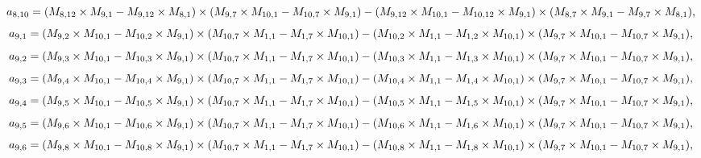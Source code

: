 \documentclass[10pt]{asme2ej}
\begin{document}
\begin{landscape}
\begin{equation}
    a_{8,10} = (M_{8,12}\times M_{9,1}-M_{9,12}\times M_{8,1})\times (M_{9,7}\times M_{10,1}-M_{10,7}\times M_{9,1})\\-(M_{9,12}\times M_{10,1}-M_{10,12}\times M_{9,1})\times (M_{8,7}\times M_{9,1}-M_{9,7}\times M_{8,1}),
\end{equation}
\begin{equation}
    a_{9,1} = (M_{9,2}\times M_{10,1}-M_{10,2}\times M_{9,1})\times (M_{10,7}\times M_{1,1}-M_{1,7}\times M_{10,1})\\-(M_{10,2}\times M_{1,1}-M_{1,2}\times M_{10,1})\times (M_{9,7}\times M_{10,1}-M_{10,7}\times M_{9,1}),
\end{equation}
\begin{equation}
    a_{9,2} = (M_{9,3}\times M_{10,1}-M_{10,3}\times M_{9,1})\times (M_{10,7}\times M_{1,1}-M_{1,7}\times M_{10,1})\\-(M_{10,3}\times M_{1,1}-M_{1,3}\times M_{10,1})\times (M_{9,7}\times M_{10,1}-M_{10,7}\times M_{9,1}),
\end{equation}
\begin{equation}
    a_{9,3} = (M_{9,4}\times M_{10,1}-M_{10,4}\times M_{9,1})\times (M_{10,7}\times M_{1,1}-M_{1,7}\times M_{10,1})\\-(M_{10,4}\times M_{1,1}-M_{1,4}\times M_{10,1})\times (M_{9,7}\times M_{10,1}-M_{10,7}\times M_{9,1}),
\end{equation}
\begin{equation}
    a_{9,4} = (M_{9,5}\times M_{10,1}-M_{10,5}\times M_{9,1})\times (M_{10,7}\times M_{1,1}-M_{1,7}\times M_{10,1})\\-(M_{10,5}\times M_{1,1}-M_{1,5}\times M_{10,1})\times (M_{9,7}\times M_{10,1}-M_{10,7}\times M_{9,1}),
\end{equation}
\begin{equation}
    a_{9,5} = (M_{9,6}\times M_{10,1}-M_{10,6}\times M_{9,1})\times (M_{10,7}\times M_{1,1}-M_{1,7}\times M_{10,1})\\-(M_{10,6}\times M_{1,1}-M_{1,6}\times M_{10,1})\times (M_{9,7}\times M_{10,1}-M_{10,7}\times M_{9,1}),
\end{equation}
\begin{equation}
    a_{9,6} = (M_{9,8}\times M_{10,1}-M_{10,8}\times M_{9,1})\times (M_{10,7}\times M_{1,1}-M_{1,7}\times M_{10,1})\\-(M_{10,8}\times M_{1,1}-M_{1,8}\times M_{10,1})\times (M_{9,7}\times M_{10,1}-M_{10,7}\times M_{9,1}),
\end{equation}

\end{landscape}
\end{document}
